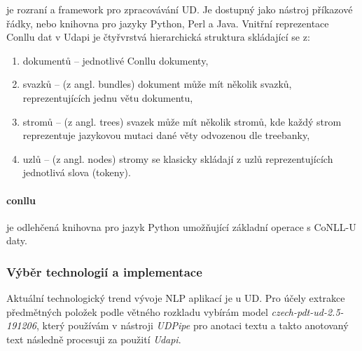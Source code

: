 \documentclass[thesis=M,czech]{FITthesis}[2019/12/23]
\begin{document}
je rozraní a framework pro zpracovávání UD\cite{Udapi}. Je dostupný jako nástroj příkazové řádky, nebo knihovna pro jazyky Python, Perl a Java. Vnitřní reprezentace Conllu dat v Udapi je čtyřvrstvá hierarchická struktura skládající se z:
\begin{enumerate}
    \item dokumentů -- jednotlivé Conllu dokumenty,
    \item svazků -- (z angl. bundles) dokument může mít několik svazků, reprezentujících jednu větu dokumentu,
    \item stromů -- (z angl. trees) svazek může mít několik stromů, kde každý strom reprezentuje jazykovou mutaci dané věty odvozenou dle treebanky,
    \item uzlů -- (z angl. nodes) stromy se klasicky skládají z uzlů reprezentujících jednotlivá slova (tokeny).
\end{enumerate}

\paragraph{conllu}

je odlehčená knihovna pro jazyk Python umožňující základní operace s CoNLL-U daty.

\subsubsection{Výběr technologií a implementace}
\label{sec:subj_conllu_extraction}

Aktuální technologický trend vývoje NLP aplikací je u UD. Pro účely extrakce předmětných položek podle větného rozkladu vybírám model \textit{czech-pdt-ud-2.5-191206}\cite{UD_Czech-PDT}, který používám v nástroji \textit{UDPipe} pro anotaci textu a takto anotovaný text následně procesuji za použití \textit{Udapi}.
\newpage
\end{document}
